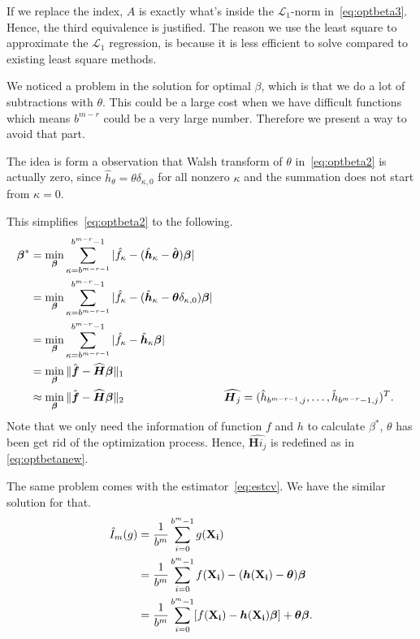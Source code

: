 If we replace the index, $A$ is exactly what's inside the $\mathcal{L}_1$-norm in~\eqref{eq:optbeta3}. 
Hence, the third equivalence is justified.  
The reason we use the least square to approximate the $\mathcal{L}_1$ regression, is because it is less efficient to solve compared to existing least square methods.


We noticed a problem in the solution for optimal $\beta$, which is that we do a lot of subtractions with $\theta$. This could be a large cost when we have difficult functions which means $b^{m-r}$ could be a very large number. Therefore we present a way to avoid that part.

The idea is form a observation that Walsh transform of $\theta$ in~\eqref{eq:optbeta2} is actually zero, since $\hat{h}_\theta= \theta\delta_{\kappa,0}$ for all nonzero $\kappa$ and the summation does not start from $\kappa=0$.

This simplifies~\eqref{eq:optbeta2} to the following. 
\begin{align}
    \boldsymbol{\beta}^*
    \notag
    &=\min_{\boldsymbol{\beta}}\sum_{\kappa=b^{m-r-1}}^{b^{m-r}-1}|\hat{f}_\kappa
    -(\hat{\boldsymbol{h}}_\kappa - \hat{\boldsymbol{\theta}})\boldsymbol{\boldsymbol{\beta}}|\\
    &=\min_{\boldsymbol{\beta}}\sum_{\kappa=b^{m-r-1}}^{b^{m-r}-1}|\hat{f}_\kappa
    -(\hat{\boldsymbol{h}}_\kappa - \boldsymbol{\theta}\delta_{\kappa,0})\boldsymbol{\boldsymbol{\beta}}| \notag \\
    &=\min_{\boldsymbol{\beta}}\sum_{\kappa=b^{m-r-1}}^{b^{m-r}-1}|\hat{f}_\kappa
    -\hat{\boldsymbol{h}}_\kappa \boldsymbol{\boldsymbol{\beta}}|\notag\\
    &=\min_{\boldsymbol{\beta}}\|\hat{\boldsymbol{f}}-\widehat{\boldsymbol{H}}\boldsymbol{\beta}\|_1\notag\\
    \label{eq:optbetanew}
    &\approx\min_{\boldsymbol{\beta}}\|\hat{\boldsymbol{f}}-\widehat{\boldsymbol{H}}\boldsymbol{\beta}\|_2
    &&\widehat{\boldsymbol{H}_j}=(\hat{h}_{b^{m-r-1},j},\dots, \hat{h}_{b^{m-r}-1,j})^T.
\end{align}
Note that we only need the information of function $f$ and $h$ to calculate $\beta^*$, $\theta$ has been get rid of the optimization process. Hence, $\widehat{\mathbf{H}i_j}$ is redefined as in \eqref{eq:optbetanew}. 

The same problem comes with the estimator~\eqref{eq:estcv}. We have the similar solution for that.
\begin{align}
    \notag
    \hat{I}_m({g})
    & = \frac{1}{b^m}\sum_{i=0}^{b^m-1}g(\mathbf{X_i})\\
    \notag
    & = \frac{1}{b^m}\sum_{i=0}^{b^m-1}f(\mathbf{X_i})-(\boldsymbol{h}(\mathbf{X_i})-\boldsymbol{\theta})\boldsymbol{\beta}\\
    \label{eq:estcvnew}
    & = \frac{1}{b^m}\sum_{i=0}^{b^m-1}[f(\mathbf{X_i})-\boldsymbol{h}(\mathbf{X_i})\boldsymbol{\beta}]+\boldsymbol{\theta}\boldsymbol{\beta}.
\end{align}

